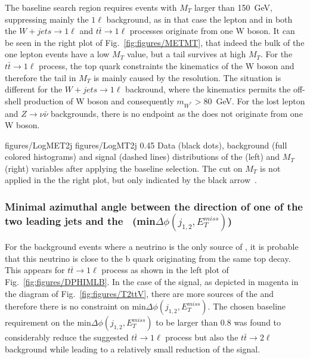 The baseline search region requires events with $M_{T}$ larger than 150~GeV, suppressing mainly the $1 \ell$ background, as in that case the lepton and \MET in both the  $W+jets \to 1\ell$  and $t \bar{t} \to 1\ell$ processes originate from one W boson.  It can be seen in the right plot of Fig.~\ref{fig:figures/METMT}, that indeed the bulk of the one lepton events have a low $M_{T}$ value, but a tail survives at high $M_{T}$. For the $t \bar{t} \to 1\ell$ process, the top quark constraints the kinematics of the W boson and therefore the tail in $M_{T}$  is mainly caused by the \MET resolution. The situation is different for the $W+jets \to 1\ell$ backround, where the kinematics permits the off-shell production of W boson and consequently $m_{W^{*}}> 80$~GeV. For the lost lepton and $Z \to \nu \bar{\nu}$ backgrounds, there is no endpoint as the \MET does not originate from one W boson.

                 {figures/LogMET2j} %
                 {figures/LogMT2j} %
                 {0.45}       %
                 { Data (black dots), background (full colored histograms) and signal (dashed lines) distributions of the \MET (left) and $M_{T}$ (right) variables after applying the baseline selection. The cut on $M_{T}$ is not applied in the the right plot, but only indicated by the black arrow~\cite{website:stopSupp}. }

\subsubsection{Minimal azimuthal angle between the direction of one of the two leading jets and the \MET~(min$\Delta \phi (j_{1,2}, E_{T}^{miss})$)}

For the background events where a neutrino is the only source of \MET, it is probable that this neutrino is close to the b quark  originating from the same top decay. This appears for $t\bar{t} \to 1\ell$ process as shown in the left plot of Fig.~\ref{fig:figures/DPHIMLB}. In the case of the signal, as depicted in magenta in the diagram of Fig.~\ref{fig:figures/T2ttV}, there are more sources of the \MET and therefore there is no constraint on min$\Delta \phi (j_{1,2}, E_{T}^{miss})$. The chosen baseline requirement on the min$\Delta \phi (j_{1,2}, E_{T}^{miss})$ to be larger than 0.8 was found to considerably reduce the suggested $t\bar{t} \to 1\ell$ process but also the $t\bar{t} \to 2\ell$  background while leading to a relatively small reduction of the signal.

